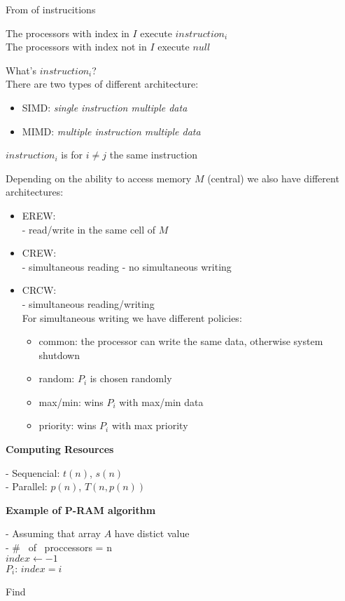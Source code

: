 \begin{algorithm}[H]
 \SetAlgoLined
 \caption{From of instrucitions}
\end{algorithm}

The processors with index in $I$ execute $instruction_i$\\
The processors with index not in $I$ execute $null$

What's \textbf{$instruction_i$}?\\
There are two types of different architecture:
\begin{itemize}
 \item SIMD: \textit{single instruction multiple data}
 \item MIMD: \textit{multiple instruction multiple data}
\end{itemize}

$instruction_i$ is for $i \neq j$ the same instruction

Depending on the ability to access memory $M$ (central) we also have different architectures:
\begin{itemize}
 \item EREW:\\
 - read/write in the same cell of $M$
 \item CREW:\\
 - simultaneous reading
 - no simultaneous writing
 \item CRCW:\\
 - simultaneous reading/writing\\
 For simultaneous writing we have different policies:
 \begin{itemize}
  \item common: the processor can write the same data, otherwise system shutdown
  \item random: $P_i$ is chosen randomly
  \item max/min: wins $P_i$ with max/min data
  \item priority: wins $P_i$ with max priority
 \end{itemize}
\end{itemize}

\textbf{Computing Resources}

- Sequencial: $t(n)$, $s(n)$\\
- Parallel: $p(n)$, $T(n, p(n))$

\textbf{Example of P-RAM algorithm}

\begin{algorithm}[H]
 - Assuming that array $A$ have distict value\\
 - \# \ of \ proccessors = n\\
 \SetAlgoLined
 $index \gets -1$\\
  {
  $P_i$:  {
   $index = i$
  } 
 }
 \caption{Find}
\end{algorithm}

